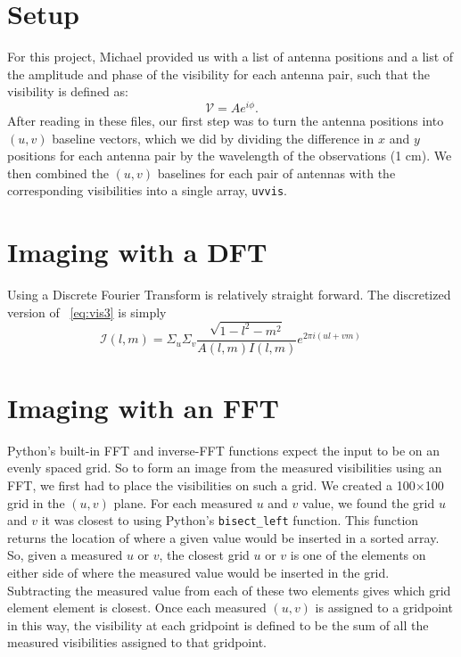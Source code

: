 \documentclass[11pt,letterpaper]{article}
\begin{document}
\section{Setup}
For this project, Michael provided us with a list of antenna positions and a 
list of the amplitude and phase of the visibility for each antenna pair, such 
that the visibility is defined as:
\begin{equation}
\mathcal{V}=Ae^{i\phi}.
\end{equation}
After reading in these files, our first step was to turn the antenna positions 
into $(u,v)$ baseline vectors, which we did by dividing the difference in 
$x$ and $y$ positions for each antenna pair by the wavelength of the 
observations (1 cm).  We then combined the $(u,v)$ baselines for 
each pair of antennas with the corresponding visibilities into a 
single array, \texttt{uvvis}.

\section{Imaging with a DFT}

Using a Discrete Fourier Transform is relatively straight forward. The discretized version of ~\ref{eq:vis3} is simply
\begin{equation}\label{eq:vis3}
\mathcal{I}(l,m)= \Sigma_{u} \! \Sigma_{v} \! \frac{\sqrt{1-l^2-m^2}}{A(l,m)I(l,m)}e^{2\pi i(ul+vm)} \,
\end{equation}  

\section{Imaging with an FFT}
Python's built-in FFT and inverse-FFT functions expect the input 
to be on an evenly spaced grid.  So to form an image from the 
measured visibilities using an FFT, we first had to place the 
visibilities on such a grid.  We created a 100$\times$100 grid in 
the $(u,v)$ plane.  For each measured $u$ and $v$ value, we found the 
grid $u$ and $v$ it was closest to using Python's \texttt{bisect\_left} 
function.  This function returns the location of where a given value 
would be inserted in a sorted array.  So, given a measured $u$ or $v$, 
the closest grid $u$ or $v$ is one of the elements on either side of 
where the measured value would be inserted in the grid.  Subtracting the 
measured value from each of these two elements gives which grid element 
element is closest.  Once each measured $(u,v)$ is assigned to a 
gridpoint in this way, the visibility at each gridpoint is defined 
to be the sum of all the measured visibilities assigned to that gridpoint.
\end{document}
